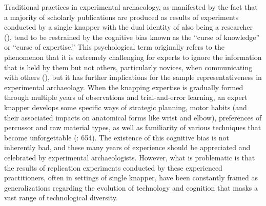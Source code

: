 \documentclass[
  11pt,
  letterpaper,
  DIV=11,
  numbers=noendperiod]{scrartcl}
\begin{document}
Traditional practices in experimental archaeology, as manifested by the
fact that a majority of scholarly publications are produced as results
of experiments conducted by a single knapper with the dual identity of
also being a researcher (),
tend to be restrained by the cognitive bias known as the ``curse of
knowledge'' or ``curse of expertise.'' This psychological term
originally refers to the phenomenon that it is extremely challenging for
experts to ignore the information that is held by them but not others,
particularly novices, when communicating with others
(), but it has further implications
for the sample representativeness in experimental archaeology. When the
knapping expertise is gradually formed through multiple years of
observations and trial-and-error learning, an expert knapper develops
some specific ways of strategic planning, motor habits (and their
associated impacts on anatomical forms like wrist and elbow),
preferences of percussor and raw material types, as well as familiarity
of various techniques that become unforgettable
(: 654). The existence of this
cognitive bias is not inherently bad, and these many years of experience
should be appreciated and celebrated by experimental archaeologists.
However, what is problematic is that the results of replication
experiments conducted by these experienced practitioners, often in
settings of single knapper, have been constantly framed as
generalizations regarding the evolution of technology and cognition that
masks a vast range of technological diversity.
\end{document}
